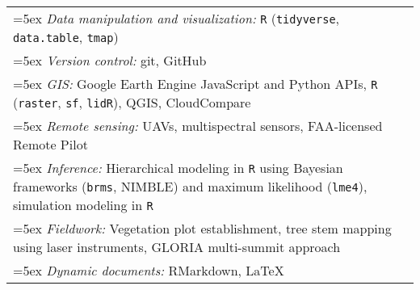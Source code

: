 \begin{longtable}{@{}>{\raggedright}p{5.25in} >{\raggedleft}X@{}}

\hangindent=5ex \emph{Data manipulation and visualization:} \texttt{R} (\texttt{tidyverse}, \texttt{data.table}, \texttt{tmap}) & \tabularnewline
\hangindent=5ex \emph{Version control:} git, GitHub & \tabularnewline
\hangindent=5ex \emph{GIS:} Google Earth Engine JavaScript and Python APIs, \texttt{R} (\texttt{raster}, \texttt{sf}, \texttt{lidR}), QGIS, CloudCompare & \tabularnewline
\hangindent=5ex \emph{Remote sensing:} UAVs, multispectral sensors, FAA-licensed Remote Pilot & \tabularnewline
\hangindent=5ex \emph{Inference:} Hierarchical modeling in \texttt{R} using Bayesian frameworks (\texttt{brms}, NIMBLE) and maximum likelihood (\texttt{lme4}), simulation modeling in \texttt{R} & \tabularnewline
\hangindent=5ex \emph{Fieldwork:} Vegetation plot establishment, tree stem mapping using laser instruments, GLORIA multi-summit approach & \tabularnewline
\hangindent=5ex \emph{Dynamic documents:} RMarkdown, \LaTeX{} & \tabularnewline

\end{longtable}
